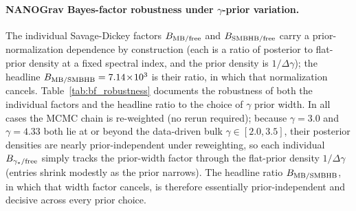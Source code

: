 \documentclass[aps,prd,twocolumn,superscriptaddress,showpacs,preprintnumbers,nofootinbib,longbibliography,floatfix]{revtex4-2}
\begin{document}
\paragraph{NANOGrav Bayes-factor robustness under $\gamma$-prior variation.}\label{app:nanograv_bf_robustness}
The individual Savage-Dickey factors $B_{\rm MB/free}$ and $B_{\rm SMBHB/free}$ carry a prior-normalization dependence by construction (each is a ratio of posterior to flat-prior density at a fixed spectral index, and the prior density is $1/\Delta\gamma$); the headline $B_{\rm MB/SMBHB} = 7.14\!\times\!10^3$ is their ratio, in which that normalization cancels. Table~\ref{tab:bf_robustness} documents the robustness of both the individual factors and the headline ratio to the choice of $\gamma$ prior width. In all cases the MCMC chain is re-weighted (no rerun required); because $\gamma = 3.0$ and $\gamma = 4.33$ both lie at or beyond the data-driven bulk $\gamma \in [2.0, 3.5]$, their posterior densities are nearly prior-independent under reweighting, so each individual $B_{\gamma_*/{\rm free}}$ simply tracks the prior-width factor through the flat-prior density $1/\Delta\gamma$ (entries shrink modestly as the prior narrows). The headline ratio $B_{\rm MB/SMBHB}$, in which that width factor cancels, is therefore essentially prior-independent and decisive across every prior choice.
\end{document}
